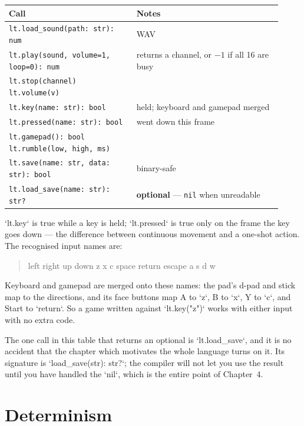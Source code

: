 \begin{center}
\small\begin{tabular}{@{}p{0.43\linewidth}p{0.49\linewidth}@{}}
\toprule
\textbf{Call} & \textbf{Notes} \\
\midrule
\texttt{lt.load\_sound(path: str): num} & WAV \\
\texttt{lt.play(sound, volume=1, loop=0): num} & returns a channel, or $-1$ if all 16 are busy \\
\texttt{lt.stop(channel)} \enskip \texttt{lt.volume(v)} & \\
\texttt{lt.key(name: str): bool} & held; keyboard and gamepad merged \\
\texttt{lt.pressed(name: str): bool} & went down this frame \\
\texttt{lt.gamepad(): bool} \enskip \texttt{lt.rumble(low, high, ms)} & \\
\texttt{lt.save(name: str, data: str): bool} & binary-safe \\
\texttt{lt.load\_save(name: str): str?} & \textbf{optional} --- \texttt{nil} when unreadable \\
\bottomrule
\end{tabular}
\end{center}

\noindent
`lt.key` is true while a key is held; `lt.pressed` is true only on the frame
the key goes down --- the difference between continuous movement and a
one-shot action. The recognised input names are:

\begin{quote}
\ttfamily left right up down z x c space return escape a s d w
\end{quote}

\noindent
Keyboard and gamepad are merged onto these names: the pad's d-pad and stick map
to the directions, and its face buttons map A to `z`, B to `x`, Y to `c`, and
Start to `return`. So a game written against `lt.key("z")` works with either
input with no extra code.

The one call in this table that returns an optional is `lt.load_save`, and it
is no accident that the chapter which motivates the whole language turns on
it. Its signature is `load_save(str): str?`; the compiler will not let you use
the result until you have handled the `nil`, which is the entire point of
Chapter~4.

\section{Determinism}

